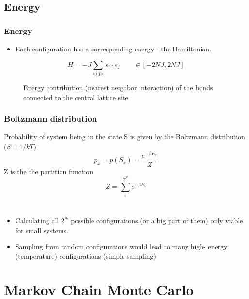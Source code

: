 \documentclass{beamer}
\newcommand{\tikzfigC}[2]{\begin{figure}[h]\begin{center}\end{center}\caption{{#2}}\end{figure}}
\begin{document}
\subsection{Energy}
\begin{frame}\frametitle{Energy}
\begin{itemize}
\item Each configuration has a corresponding energy - the Hamiltonian.
\end{itemize}\end{frame}
\begin{frame}
\begin{equation*}
H = -J \sum_{\text{<i,j>}}s_i\cdot s_j\qquad\in[-2NJ,2NJ]
\end{equation*}\tikzfigC{Examples}{Energy contribution (nearest neighbor interaction) of the bonds connected to the central lattice site}
\end{frame}

\begin{frame}
\frametitle{Boltzmann distribution}
 Probability of system being in the state S is given by the Boltzmann distribution ($\beta = 1/kT$) \[p_x = p(S_x) =\frac{ e^{-\beta E_x}}{Z}\]
 Z is the the partition function\[Z = \sum_i^{2^N} e^{-\beta E_{i}}\]
\end{frame}

\section*{}
\begin{frame}
\begin{itemize}
\item Calculating all $2^N$ possible configurations (or a big part of them) only viable for small systems.
\item Sampling from random configurations would lead to many high- energy (temperature) configurations (simple sampling)
\end{itemize}

\end{frame}

\section{Markov Chain Monte Carlo}
\end{document}
